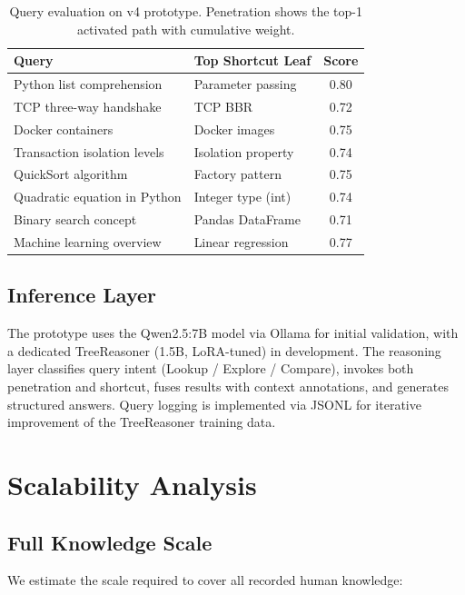 \documentclass[11pt,a4paper]{article}
\begin{document}
\begin{table}[H]
\centering
\caption{Query evaluation on v4 prototype. Penetration shows the top-1 activated path with cumulative weight.}
\label{tab:results}
\begin{tabular}{llc}
\toprule
\textbf{Query} & \textbf{Top Shortcut Leaf} & \textbf{Score} \\
\midrule
Python list comprehension & Parameter passing & 0.80 \\
TCP three-way handshake & TCP BBR & 0.72 \\
Docker containers & Docker images & 0.75 \\
Transaction isolation levels & Isolation property & 0.74 \\
QuickSort algorithm & Factory pattern & 0.75 \\
Quadratic equation in Python & Integer type (int) & 0.74 \\
Binary search concept & Pandas DataFrame & 0.71 \\
Machine learning overview & Linear regression & 0.77 \\
\bottomrule
\end{tabular}
\end{table}

\subsection{Inference Layer}

The prototype uses the Qwen2.5:7B model via Ollama for initial validation, with a dedicated TreeReasoner (1.5B, LoRA-tuned) in development. The reasoning layer classifies query intent (Lookup / Explore / Compare), invokes both penetration and shortcut, fuses results with context annotations, and generates structured answers. Query logging is implemented via JSONL for iterative improvement of the TreeReasoner training data.

\section{Scalability Analysis}
\label{sec:scalability}

\subsection{Full Knowledge Scale}

We estimate the scale required to cover all recorded human knowledge:
\end{document}
